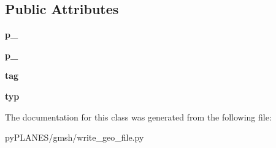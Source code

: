 \subsection*{Public Attributes}
\begin{DoxyCompactItemize}
\item 
\mbox{\label{classpy_p_l_a_n_e_s_1_1gmsh_1_1write__geo__file_1_1_gmsh_1_1_line_adcda2a8007b6a36c36cf9863db3dc5f1}} 
{\bfseries p\+\_}
\item 
\mbox{\label{classpy_p_l_a_n_e_s_1_1gmsh_1_1write__geo__file_1_1_gmsh_1_1_line_aeb1d41f6d209acd442fcb89ff605d064}} 
{\bfseries p\+\_}
\item 
\mbox{\label{classpy_p_l_a_n_e_s_1_1gmsh_1_1write__geo__file_1_1_gmsh_1_1_line_a4a63127c1e595dad350d003ed3896ac7}} 
{\bfseries tag}
\item 
\mbox{\label{classpy_p_l_a_n_e_s_1_1gmsh_1_1write__geo__file_1_1_gmsh_1_1_line_a29360f0474a216664b445c6fd9fc2ce9}} 
{\bfseries typ}
\end{DoxyCompactItemize}


The documentation for this class was generated from the following file\+:\begin{DoxyCompactItemize}
\item 
py\+P\+L\+A\+N\+E\+S/gmsh/write\+\_\+geo\+\_\+file.\+py\end{DoxyCompactItemize}
